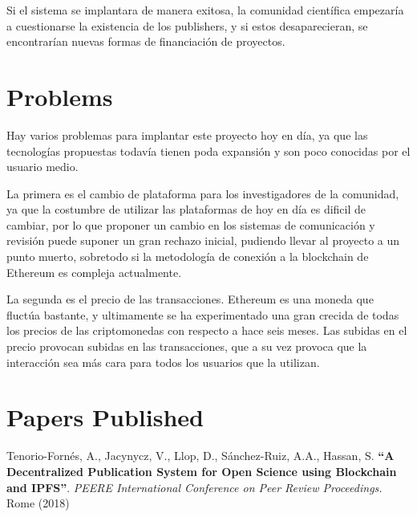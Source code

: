 Si el sistema se implantara de manera exitosa, la comunidad científica empezaría
a cuestionarse la existencia de los publishers, y si estos desaparecieran, se
encontrarían nuevas formas de financiación de proyectos.

\section{Problems}


Hay varios problemas para implantar este proyecto hoy en día, ya que las
tecnologías propuestas todavía tienen poda expansión y son poco conocidas por el
usuario medio.

La primera es el cambio de plataforma para los investigadores de la comunidad,
ya que la costumbre de utilizar las plataformas de hoy en día es dificil de
cambiar, por lo que proponer un cambio en los sistemas de comunicación y
revisión puede suponer un gran rechazo inicial, pudiendo llevar al proyecto a un
punto muerto, sobretodo si la metodología de conexión a la blockchain de
Ethereum es compleja actualmente.

La segunda es el precio de las transacciones. Ethereum es una moneda que fluctúa
bastante, y ultimamente se ha experimentado una gran crecida de todas los
precios de las criptomonedas con respecto a hace seis meses. Las subidas en el
precio provocan subidas en las transacciones, que a su vez provoca que la
interacción sea más cara para todos los usuarios que la utilizan.

\section{Papers Published}
Tenorio-Fornés, A., Jacynycz, V., Llop, D., Sánchez-Ruiz, A.A., Hassan, S. \textbf{“A
Decentralized Publication System for Open Science using Blockchain and IPFS”}.
\emph{PEERE International Conference on Peer Review Proceedings.} Rome (2018)


